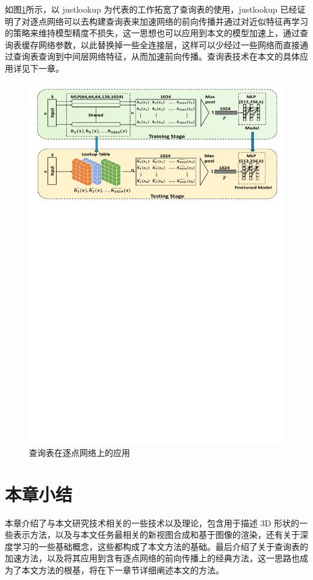 如图\ref{fig:justlookup}所示，以 justlookup\cite{lin2019justlookup} 为代表的工作拓宽了查询表的使用，justlookup 已经证明了对逐点网络可以去构建查询表来加速网络的前向传播并通过对近似特征再学习的策略来维持模型精度不损失，这一思想也可以应用到本文的模型加速上，通过查询表缓存网络参数，以此替换掉一些全连接层，这样可以少经过一些网络而直接通过查询表查询到中间层网络特征，从而加速前向传播。查询表技术在本文的具体应用详见下一章。

\begin{figure}[t]
    \centering
    \includegraphics[width=0.9\linewidth]{figures/justlookup.pdf}
    \caption{查询表在逐点网络上的应用\cite{lin2019justlookup}}
    \label{fig:justlookup}
\end{figure}


\section{本章小结}
本章介绍了与本文研究技术相关的一些技术以及理论，包含用于描述 3D 形状的一些表示方法，以及与本文任务最相关的新视图合成和基于图像的渲染，还有关于深度学习的一些基础概念，这些都构成了本文方法的基础。最后介绍了关于查询表的加速方法，以及将其应用到含有逐点网络的前向传播上的经典方法，这一思路也成为了本文方法的根基，将在下一章节详细阐述本文的方法。
